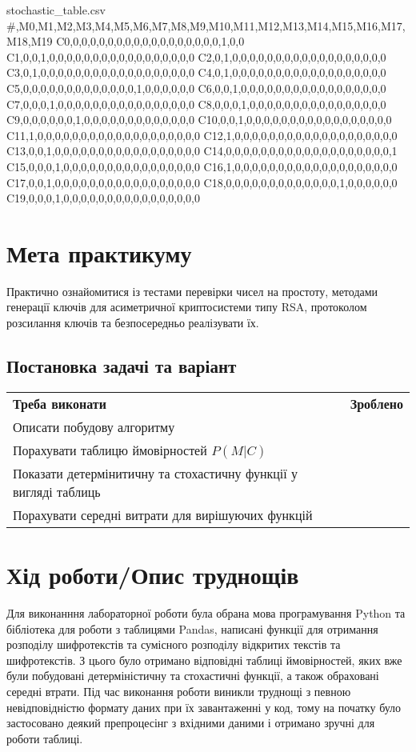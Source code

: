 \begin{filecontents*}{stochastic_table.csv}
#,M0,M1,M2,M3,M4,M5,M6,M7,M8,M9,M10,M11,M12,M13,M14,M15,M16,M17,M18,M19
C0,0,0,0,0,0,0,0,0,0,0,0,0,0,0,0,0,0,1,0,0
C1,0,0,1,0,0,0,0,0,0,0,0,0,0,0,0,0,0,0,0,0
C2,0,1,0,0,0,0,0,0,0,0,0,0,0,0,0,0,0,0,0,0
C3,0,1,0,0,0,0,0,0,0,0,0,0,0,0,0,0,0,0,0,0
C4,0,1,0,0,0,0,0,0,0,0,0,0,0,0,0,0,0,0,0,0
C5,0,0,0,0,0,0,0,0,0,0,0,0,0,1,0,0,0,0,0,0
C6,0,0,1,0,0,0,0,0,0,0,0,0,0,0,0,0,0,0,0,0
C7,0,0,0,1,0,0,0,0,0,0,0,0,0,0,0,0,0,0,0,0
C8,0,0,0,1,0,0,0,0,0,0,0,0,0,0,0,0,0,0,0,0
C9,0,0,0,0,0,0,1,0,0,0,0,0,0,0,0,0,0,0,0,0
C10,0,0,1,0,0,0,0,0,0,0,0,0,0,0,0,0,0,0,0,0
C11,1,0,0,0,0,0,0,0,0,0,0,0,0,0,0,0,0,0,0,0
C12,1,0,0,0,0,0,0,0,0,0,0,0,0,0,0,0,0,0,0,0
C13,0,0,1,0,0,0,0,0,0,0,0,0,0,0,0,0,0,0,0,0
C14,0,0,0,0,0,0,0,0,0,0,0,0,0,0,0,0,0,0,0,1
C15,0,0,0,1,0,0,0,0,0,0,0,0,0,0,0,0,0,0,0,0
C16,1,0,0,0,0,0,0,0,0,0,0,0,0,0,0,0,0,0,0,0
C17,0,0,1,0,0,0,0,0,0,0,0,0,0,0,0,0,0,0,0,0
C18,0,0,0,0,0,0,0,0,0,0,0,0,0,1,0,0,0,0,0,0
C19,0,0,0,1,0,0,0,0,0,0,0,0,0,0,0,0,0,0,0,0
\end{filecontents*}

\section{Мета практикуму}
Практично ознайомитися із тестами перевірки чисел на простоту, методами генерації ключів для асиметричної криптосистеми типу RSA, протоколом розсилання ключів та безпосередньо реалізувати їх.

\subsection{Постановка задачі та варіант}
\begin{tabularx}{\textwidth}{X|X}
	\textbf{Треба виконати} & \textbf{Зроблено} \\
	Описати побудову алгоритму \checkmark\\
	Порахувати таблицю ймовірностей $P(\textit{M}|\textit{C})$ \checkmark\\
	Показати детермінитичну та стохастичну функції у вигляді таблиць & \checkmark\\
	Порахувати середні витрати для вирішуючих функцій & \checkmark\\
\end{tabularx}



\section{Хід роботи/Опис труднощів}
    Для виконанння лабораторної роботи була обрана мова програмування Python та бібліотека для роботи з таблицями Pandas, написані функції для отримання розподілу шифротекстів та сумісного розподілу відкритих текстів та шифротекстів. 
    З цього було отримано відповідні таблиці ймовірностей, яких вже були побудовані детерміністичну та стохастичні функції, а також обраховані середні втрати. 
    Під час виконання роботи виникли труднощі з певною невідповідністю формату даних при їх завантаженні у код, тому на початку було застосовано деякий препроцесінг з вхідними даними і отримано зручні для роботи таблиці.


